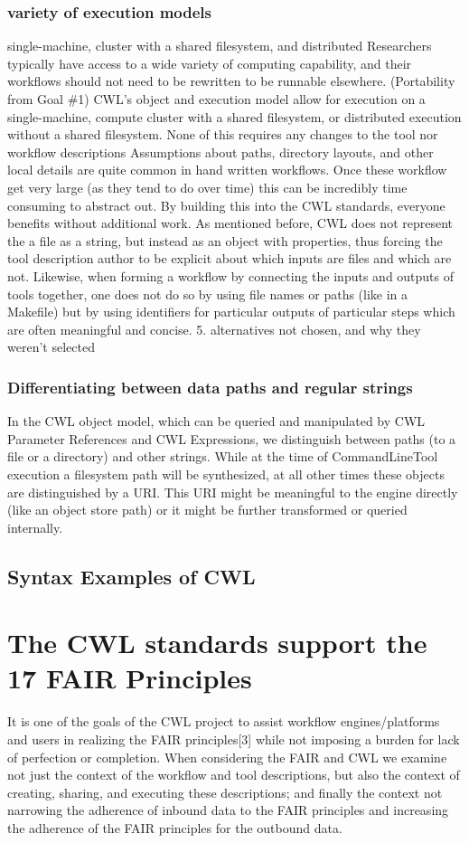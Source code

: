 \subsubsection{variety of execution models}
single-machine, cluster with a shared filesystem, and distributed
Researchers typically have access to a wide variety of computing capability, and their workflows should not need to be rewritten to be runnable elsewhere. (Portability from Goal \#1)
CWL’s object and execution model allow for execution on a single-machine, compute cluster with a shared filesystem, or distributed execution without a shared filesystem. None of this requires any changes to the tool nor workflow descriptions
Assumptions about paths, directory layouts, and other local details are quite common in hand written workflows. Once these workflow get very large (as they tend to do over time) this can be incredibly time consuming to abstract out. By building this into the CWL standards, everyone benefits without additional work.
As mentioned before, CWL does not represent the a file as a string, but instead as an object with properties, thus forcing the tool description author to be explicit about which inputs are files and which are not. Likewise, when forming a workflow by connecting the inputs and outputs of tools together, one does not do so by using file names or paths (like in a Makefile) but by using identifiers for particular outputs of particular steps which are often meaningful and concise.
5. alternatives not chosen, and why they weren't selected
\subsubsection{Differentiating between data paths and regular strings}
In the CWL object model, which can be queried and manipulated by CWL Parameter References and CWL Expressions, we distinguish between paths (to a file or a directory) and other strings.
While at the time of CommandLineTool execution a filesystem path will be synthesized, at all other times these objects are distinguished by a URI.
This URI might be meaningful to the engine directly (like an object store path) or it might be further transformed or queried internally.

\subsection{Syntax Examples of CWL}

\section{The CWL standards support the 17 FAIR Principles}
It is one of the goals of the CWL project to assist workflow engines/platforms and users in realizing the FAIR principles[3] while not imposing a burden for lack of perfection or completion. When considering the FAIR and CWL we examine not just the context of the workflow and tool descriptions, but also the context of creating, sharing, and executing these descriptions; and finally the context not narrowing the adherence of inbound data to the FAIR principles and increasing the adherence of the FAIR principles for the outbound data.


